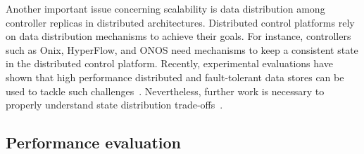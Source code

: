Another important issue concerning scalability is data distribution among controller replicas in distributed architectures.
Distributed control platforms rely on data distribution mechanisms to achieve their goals.
For instance, controllers such as Onix, HyperFlow, and ONOS need mechanisms to keep a consistent state in the distributed control platform.
Recently, experimental evaluations have shown that high performance distributed and fault-tolerant data stores can be used to tackle such challenges~\cite{botelho2013}. 
Nevertheless, further work is necessary to properly understand state distribution trade-offs~\cite{levin2012}.

\subsection{Performance evaluation}
\label{sec:performance-eval}

